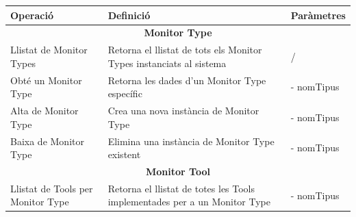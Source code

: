 \begin{table}[htb]
\centering
\label{PeticionsOrchestrator}
\begin{tabular}{|p{4cm}|p{6cm}|p{3cm}|}
\hline
\textbf{Operació}                            & \textbf{Definició}                                                        & \textbf{Paràmetres}                                                                                                           \\ \hline
\multicolumn{3}{|c|}{\textbf{Monitor Type}}                                                                                                                                                                                                                        \\ \hline
Llistat de Monitor Types                     & Retorna el llistat de tots els Monitor Types instanciats al sistema       & /                                                                                                                                       \\ \hline
Obté un Monitor Type                         & Retorna les dades d'un Monitor Type específic                             & - nomTipus                                                                                                                              \\ \hline
Alta de Monitor Type                         & Crea una nova instància de Monitor Type                                   & - nomTipus                                                                                                                              \\ \hline
Baixa de Monitor Type                        & Elimina una instància de Monitor Type existent                            & - nomTipus                                                                                                                              \\ \hline
\multicolumn{3}{|c|}{\textbf{Monitor Tool}}                                                                                                                                                                                                                        \\ \hline
Llistat de Tools per Monitor Type            & Retorna el llistat de totes les Tools implementades per a un Monitor Type & - nomTipus                                                                                                                              \\ \hline

\end{tabular}
\end{table}
